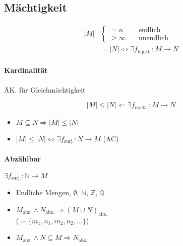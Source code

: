 \subsection{Mächtigkeit}

\begin{align*}
  |M| & \begin{cases}
    = n \quad         & \text{endlich}   \\
    \geq \infty \quad & \text{unendlich}
  \end{cases}                                         \\
      & = |N| \Leftrightarrow \exists f_{\text{bijekt.}}: M \rightarrow N
\end{align*}

\paragraph{Kardinalität}
ÄK. für Gleichmächtigkeit

$$|M| \leq |N| \Leftarrow \exists f_\text{injekt.}: M \rightarrow N$$

\begin{itemize}
  \item $M \subseteq N \Rightarrow |M| \leq |N|$
  \item $|M| \leq |N| \Leftrightarrow \exists f_\text{surj.}: N \rightarrow M$ (AC)
\end{itemize}

\paragraph{Abzählbar}  $\exists f_\text{surj.}: \mathbb{N} \rightarrow M$

\begin{itemize}
  \item Endliche Mengen, $\emptyset$, $\mathbb{N}$, $\mathbb{Z}$, $\boldsymbol{\mathbb{Q}}$
  \item $M_\text{abz.} \land N_\text{abz.} \Rightarrow (M \cup N)_\text{abz.}$ \\
        ($= \{ m_1, n_1, m_2, n_2, \dots \}$)

  \item $M_\text{abz.} \land N \subseteq M \Rightarrow N_\text{abz.}$
\end{itemize}

